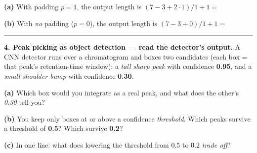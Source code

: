 \documentclass[11pt]{article}
\newif\ifsolution
\newcommand{\blk}[1]{\underline{\hspace{#1}}}
\newcommand{\rb}[2]{\ifsolution\textbf{#1}\else\blk{#2}\fi}
\newcommand{\keybox}[1]{\ifsolution\par\vspace{2pt}%
  \fbox{\parbox{0.965\textwidth}{\small\textbf{Answer.}\; #1}}\par\fi}
\newcommand{\work}[1]{\ifsolution\else\vspace{#1}\fi}
\begin{document}
\vspace{3pt}
\textbf{(a)} With padding $p=1$, the output length is\quad
$(7-3+2\cdot1)/1+1=$ \rb{$7$}{2cm}

\work{0.4cm}

\textbf{(b)} With \emph{no} padding ($p=0$), the output length is\quad
$(7-3+0)/1+1=$ \rb{$5$}{2cm}

\work{0.6cm}

\keybox{(a) $(7-3+2)/1+1 = 6+1 = \mathbf{7}$ --- padding~1 with a $3\times3$ filter keeps the length
unchanged (``same'' convolution). (b) $(7-3+0)/1+1 = 4+1 = \mathbf{5}$ --- without padding the map
\emph{shrinks} by two, and the edge positions get fewer looks. This is why we pad: to preserve length
and keep the edges in play.}

\vspace{2pt}\hrule\vspace{5pt}

\textbf{4. Peak picking as object detection --- read the detector's output.}\; {\small A CNN detector
runs over a chromatogram and boxes two candidates (each box = that peak's retention-time window): a
\emph{tall sharp peak} with confidence \textbf{0.95}, and a \emph{small shoulder bump} with confidence
\textbf{0.30}.}

\vspace{3pt}
\textbf{(a)} Which box would you integrate as a real peak, and what does the other's \emph{0.30} tell you?

\work{0.9cm}
\ifsolution\else\blk{\linewidth}\fi

\textbf{(b)} You keep only boxes at or above a confidence \emph{threshold}. Which peaks survive a
threshold of \textbf{0.5}? Which survive \textbf{0.2}?

\work{0.9cm}
\ifsolution\else\blk{\linewidth}\fi

\textbf{(c)} In one line: what does lowering the threshold from 0.5 to 0.2 \emph{trade off}?

\work{0.8cm}
\ifsolution\else\blk{\linewidth}\fi

\keybox{(a) Integrate the \textbf{0.95} box --- a confident, genuine peak; the \textbf{0.30} is a
\textbf{low-confidence} shoulder/noise the model is unsure is a real peak, so you'd flag it for review
or drop it. (b) At \textbf{0.5}: only the \textbf{0.95} peak survives (0.30 $<$ 0.5 is dropped) --- one
clean peak. At \textbf{0.2}: \textbf{both} survive (0.30 $\ge$ 0.2), so the dubious bump gets integrated
too. (c) Lowering the threshold \textbf{catches more real peaks (higher sensitivity/recall) but admits
more false ones (lower specificity/precision)} --- the same threshold trade-off from Lectures 4 and 10;
the confidence \emph{score} is the dial you turn. (Peak review = deciding \emph{where} a peak is and
\emph{whether} it is genuine is exactly the detection problem PeakOnly (2020) solves.)}
\end{document}
